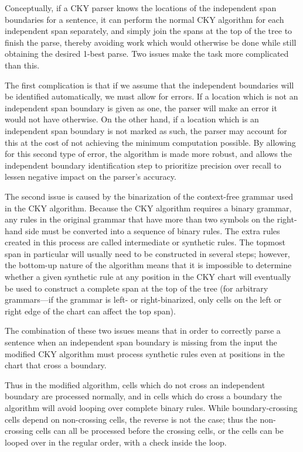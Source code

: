 \documentclass[11pt]{article}
\begin{document}
Conceptually, if a CKY parser knows the locations of the
independent span boundaries for a sentence, it can perform the normal
CKY algorithm for each independent span separately, and simply join
the spans at the top of the tree to finish the parse, thereby avoiding
work which would otherwise be done while still obtaining the desired
1-best parse. Two issues make the task more complicated than this.

The first complication is that if we assume that the independent boundaries
will be identified automatically, we must allow for errors. If a
location which is not an independent span boundary is given as one,
the parser will make an error it would not have otherwise. On the
other hand, if a location which is an independent span boundary is not
marked as such, the parser may account for this at the cost of not
achieving the minimum computation possible. By allowing for this
second type of error, the algorithm is made more robust, and allows
the independent boundary identification step to prioritize precision
over recall to lessen negative impact on the parser’s accuracy.

The second issue is caused by the binarization of the context-free
grammar used in the CKY algorithm. Because the CKY algorithm requires
a binary grammar, any rules in the original grammar that have more
than two symbols on the right-hand side must be converted into a
sequence of binary rules. The extra rules created in this process are
called intermediate or synthetic rules. The topmost span in particular
will usually need to be constructed in several steps; however, the
bottom-up nature of the algorithm means that it is impossible to
determine whether a given synthetic rule at any position in the CKY
chart will eventually be used to construct a complete span at the top
of the tree (for arbitrary grammars—if the grammar is left- or
right-binarized, only cells on the left or right edge of the chart can
affect the top span).

The combination of these two issues means that in order to correctly
parse a sentence when an independent span boundary is missing from the
input the modified CKY algorithm must process synthetic rules even at
positions in the chart that cross a boundary.

Thus in the modified algorithm, cells which do not cross an
independent boundary are processed normally, and in cells which do
cross a boundary the algorithm will avoid looping over complete
binary rules. While boundary-crossing cells depend on non-crossing
cells, the reverse is not the case; thus the non-crossing cells can
all be processed before the crossing cells, or the cells can be looped
over in the regular order, with a check inside the loop.
\end{document}
